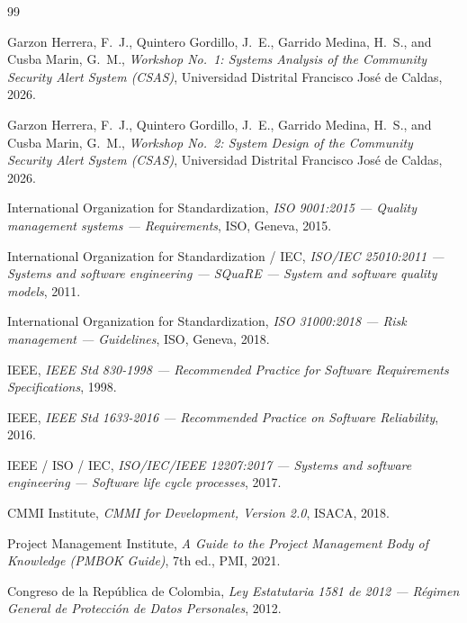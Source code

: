 \documentclass[conference,a4paper,10pt]{IEEEtran}
\begin{document}
\begin{thebibliography}{99}

Garzon Herrera, F.~J., Quintero Gordillo, J.~E., Garrido Medina, H.~S., and
Cusba Marin, G.~M.,
\emph{Workshop No.\ 1: Systems Analysis of the Community Security Alert
System (CSAS)}, Universidad Distrital Francisco José de Caldas, 2026.

Garzon Herrera, F.~J., Quintero Gordillo, J.~E., Garrido Medina, H.~S., and
Cusba Marin, G.~M.,
\emph{Workshop No.\ 2: System Design of the Community Security Alert
System (CSAS)}, Universidad Distrital Francisco José de Caldas, 2026.

International Organization for Standardization,
\emph{ISO 9001:2015 --- Quality management systems --- Requirements},
ISO, Geneva, 2015.

International Organization for Standardization / IEC,
\emph{ISO/IEC 25010:2011 --- Systems and software engineering ---
SQuaRE --- System and software quality models}, 2011.

International Organization for Standardization,
\emph{ISO 31000:2018 --- Risk management --- Guidelines},
ISO, Geneva, 2018.

IEEE, \emph{IEEE Std 830-1998 --- Recommended Practice for Software
Requirements Specifications}, 1998.

IEEE, \emph{IEEE Std 1633-2016 --- Recommended Practice on Software
Reliability}, 2016.

IEEE / ISO / IEC, \emph{ISO/IEC/IEEE 12207:2017 --- Systems and
software engineering --- Software life cycle processes}, 2017.

CMMI Institute, \emph{CMMI for Development, Version 2.0}, ISACA, 2018.

Project Management Institute, \emph{A Guide to the Project Management
Body of Knowledge (PMBOK Guide)}, 7th ed., PMI, 2021.

Congreso de la República de Colombia,
\emph{Ley Estatutaria 1581 de 2012 --- Régimen General de Protección
de Datos Personales}, 2012.

\end{thebibliography}
\end{document}

